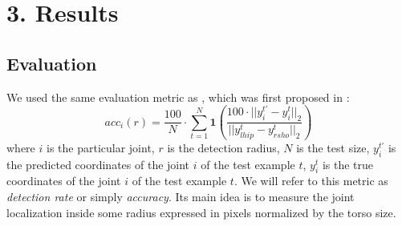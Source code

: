 \documentclass[a4paper,10pt]{article}
\begin{document}
	
	
	
	
\section{3. Results}	

	\subsection{Evaluation}
	
	We used the same evaluation metric as \cite{cnn_pgm_for_hpe}, which was first proposed in \cite{modec}:
	\begin{equation*}
		acc_i(r) = \frac{100}{N} \cdot \sum_{t=1}^{N} \textbf{1} \left( \frac{100 \cdot ||y_i^{t'} - y_i^{t}||_2}{||y_{lhip}^{t} - y_{rsho}^{t}||_2} \right)
	\end{equation*}
	where $i$ is the particular joint, $r$ is the detection radius, $N$ is the test size, $y_i^{t'}$ is the predicted coordinates of the joint $i$ of the test example $t$, $y_i^{t}$ is the true coordinates of the joint $i$ of the test example $t$. We will refer to this metric as \textit{detection rate} or simply \textit{accuracy}. Its main idea is to measure the joint localization inside some radius expressed in pixels normalized by the torso size. 
\end{document}
